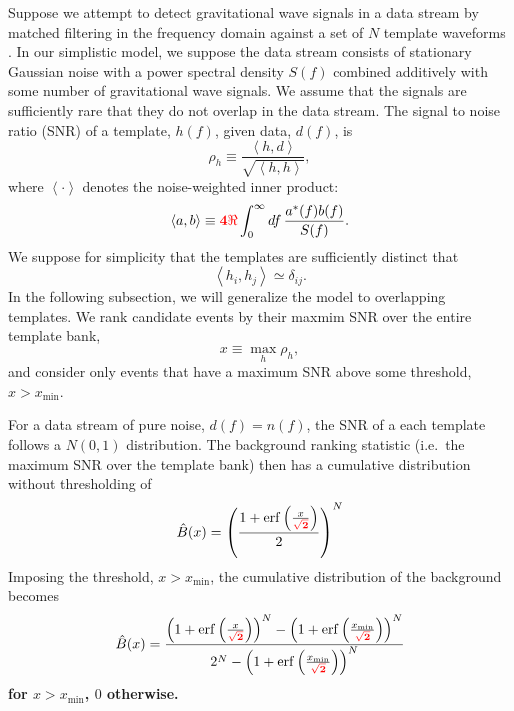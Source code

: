 \documentclass[aps,prd]{revtex4-1}
\newcommand{\xmin}{x_\mathrm{min}}
\newcommand{\ilya}[1]{{\color{red} \bf #1}}
\DeclareMathOperator{\erf}{erf}
\begin{document}
Suppose we attempt to detect gravitational wave signals in a data
stream by matched filtering in the frequency domain against a set of
$N$ template waveforms \citep[e.g.,][]{findchirppaper,LVC2011}.  In
our simplistic model, we suppose the data stream consists of
stationary Gaussian noise with a power spectral density $S(f)$
combined additively with some number of gravitational wave signals.
We assume that the signals are sufficiently rare that they do not
overlap in the data stream.  The signal to noise ratio (SNR) of a
template, $h(f)$, given data, $d(f)$, is
\begin{equation}
  \rho_h \equiv \frac{\left\langle h, d \right\rangle}{\sqrt{\left
      \langle h, h \right\rangle}},
\end{equation}
where $\left \langle \cdot \right\rangle$ denotes the noise-weighted
inner product:
\begin{equation}
  \left\langle a, b \right\rangle \equiv \ilya{4 \Re} \int_0^\infty
  df\, \frac{a^*(f) b(f)}{S(f)}.
\end{equation}
We suppose for simplicity that the templates are sufficiently distinct
that
\begin{equation}
  \left\langle h_i, h_j \right\rangle \simeq \delta_{ij}.
\end{equation}
In the following subsection, we will generalize the model to
overlapping templates.  We rank candidate events by their maxmim SNR
over the entire template bank,
\begin{equation}
  x \equiv \max_{h} \rho_h,
\end{equation}
and consider only events that have a maximum SNR above some threshold,
$x > \xmin$.

For a data stream of pure noise, $d(f) = n(f)$, the SNR of a each
template follows a $N(0,1)$ distribution.  The background ranking
statistic (i.e.\ the maximum SNR over the template bank) then has a
cumulative distribution without thresholding of
\begin{equation}
  \hat{B}(x) = \left( \frac{1 + \erf\left( \frac{x}{\ilya{\sqrt{2}}}
    \right)}{2} \right)^N
\end{equation}
Imposing the threshold, $x > \xmin$, the cumulative distribution of
the background becomes
\begin{equation}
  \label{eq:analytic-background-rate}
  \hat{B}(x) = \frac{\left( 1 + \erf\left( \frac{x}{\ilya{\sqrt{2}}}
    \right) \right)^N - \left( 1 + \erf\left(
    \frac{\xmin}{\ilya{\sqrt{2}}} \right) \right)^N}{2^N - \left( 1 +
    \erf\left( \frac{\xmin}{\ilya{\sqrt{2}}} \right) \right)^N }
\end{equation}
\ilya{for $x>\xmin$, $0$ otherwise.}
\end{document}
